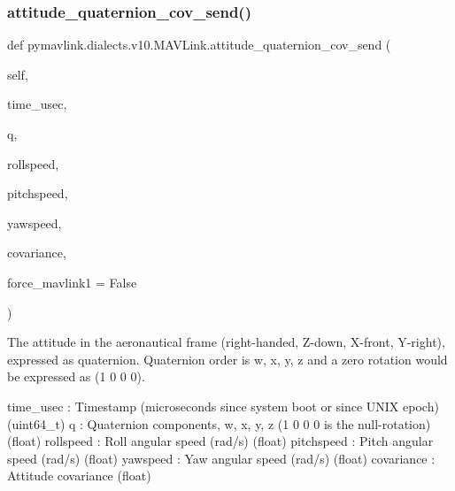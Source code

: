 \subsubsection{\texorpdfstring{attitude\+\_\+quaternion\+\_\+cov\+\_\+send()}{attitude\_quaternion\_cov\_send()}}
{\footnotesize\ttfamily def pymavlink.\+dialects.\+v10.\+M\+A\+V\+Link.\+attitude\+\_\+quaternion\+\_\+cov\+\_\+send (\begin{DoxyParamCaption}\item[{}]{self,  }\item[{}]{time\+\_\+usec,  }\item[{}]{q,  }\item[{}]{rollspeed,  }\item[{}]{pitchspeed,  }\item[{}]{yawspeed,  }\item[{}]{covariance,  }\item[{}]{force\+\_\+mavlink1 = {\ttfamily False} }\end{DoxyParamCaption})}

\begin{DoxyVerb}The attitude in the aeronautical frame (right-handed, Z-down, X-front,
Y-right), expressed as quaternion. Quaternion order is
w, x, y, z and a zero rotation would be expressed as
(1 0 0 0).

time_usec                 : Timestamp (microseconds since system boot or since UNIX epoch) (uint64_t)
q                         : Quaternion components, w, x, y, z (1 0 0 0 is the null-rotation) (float)
rollspeed                 : Roll angular speed (rad/s) (float)
pitchspeed                : Pitch angular speed (rad/s) (float)
yawspeed                  : Yaw angular speed (rad/s) (float)
covariance                : Attitude covariance (float)\end{DoxyVerb}
 \mbox{\label{classpymavlink_1_1dialects_1_1v10_1_1MAVLink_a4f8a7c528d9410851438a9e2885bce4d}} 
